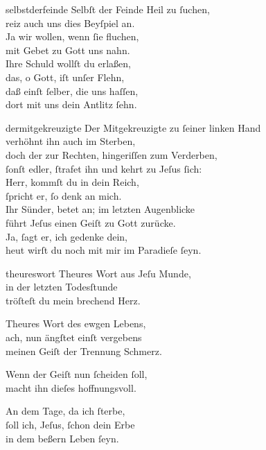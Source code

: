 \documentclass[shorttitlesize=55,tocstyle=ref-genre]{ees}
\begin{document}
{\begin{movement}{selbstderfeinde}
  \voice[Coro]
  Selbſt der Feinde Heil zu ſuchen,\\
  reiz auch uns dies Beyſpiel an.\\
  Ja wir wollen, wenn ſie fluchen,\\
  mit Gebet zu Gott uns nahn.\\
  Ihre Schuld wollſt du erlaßen,\\
  das, o Gott, iſt unſer Flehn,\\
  daß einſt ſelber, die uns haſſen,\\
  dort mit uns dein Antlitz ſehn.
\end{movement}

\begin{movement}{dermitgekreuzigte}
  \voice[Basso]
  Der Mitgekreuzigte zu ſeiner linken Hand\\
  verhöhnt ihn auch im Sterben,\\
  doch der zur Rechten, hingeriſſen zum Verderben,\\
  ſonſt edler, ſtrafet ihn und kehrt zu Jeſus ſich:\\
  Herr, kommſt du in dein Reich,\\
  ſpricht er, ſo denk an mich.\\
  Ihr Sünder, betet an; im letzten Augenblicke\\
  führt Jeſus einen Geiſt zu Gott zurücke.\\
  Ja, ſagt er, ich gedenke dein,\\
  heut wirſt du noch mit mir im Paradieſe ſeyn.
\end{movement}

\begin{movement}{theureswort}
  \voice[Soprano]
  Theures Wort aus Jeſu Munde,\\
  in der letzten Todesſtunde\\
  tröſteſt du mein brechend Herz.

  \voice[Alto]
  Theures Wort des ewgen Lebens,\\
  ach, nun ängſtet einſt vergebens\\
  meinen Geiſt der Trennung Schmerz.

  \voice[both]
  Wenn der Geiſt nun ſcheiden ſoll,\\
  macht ihn dieſes hoffnungsvoll.

  \voice[Soprano]
  An dem Tage, da ich ſterbe,\\
  ſoll ich, Jeſus, ſchon dein Erbe\\
  in dem beßern Leben ſeyn.


\end{movement}}
\end{document}
